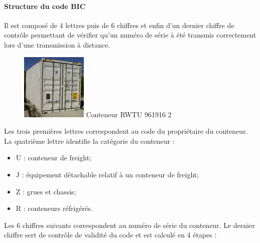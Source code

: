 \paragraph*{Structure du code BIC}
Il est composé de 4 lettres puis de 6 chiffres et enfin d'un dernier chiffre de contrôle permettant de vérifier qu'un numéro de série à été transmis correctement lors d'une transmission à distance. 

\begin{figure}
 \includegraphics[width=0.28\textwidth]{chapitres/application/BICconteneur.jpg}
 \centering
 \tiny Conteneur RWTU 961916 2 
\end{figure}
Les trois premières lettres correspondent au code du propriétaire du conteneur. La quatrième lettre identifie la catégorie du conteneur : 
\begin{itemize}
 \item U : conteneur de freight;
 \item J : équipement détachable relatif à un conteneur de freight;
 \item Z : grues et chassis;
 \item R : conteneurs réfrigérés.
\end{itemize}

Les 6 chiffres suivants correspondent au numéro de série du conteneur. Le dernier chiffre sert de contrôle de validité du code et est calculé en 4 étapes : 


